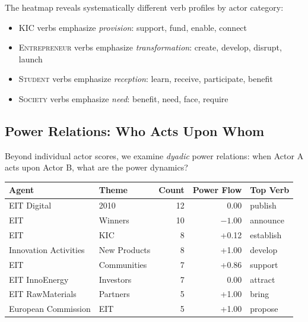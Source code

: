 \documentclass[../main.tex]{subfiles}
\begin{document}
The heatmap reveals systematically different verb profiles by actor category:

\begin{itemize}
    \item \textsc{KIC} verbs emphasize \textit{provision}: support, fund, enable, connect
    \item \textsc{Entrepreneur} verbs emphasize \textit{transformation}: create, develop, disrupt, launch
    \item \textsc{Student} verbs emphasize \textit{reception}: learn, receive, participate, benefit
    \item \textsc{Society} verbs emphasize \textit{need}: benefit, need, face, require
\end{itemize}

\subsection{Power Relations: Who Acts Upon Whom}

Beyond individual actor scores, we examine \textit{dyadic} power relations: when Actor A acts upon Actor B, what are the power dynamics?

\begin{center}
\small
\begin{tabular}{llrrl}
\toprule
\textbf{Agent} & \textbf{Theme} & \textbf{Count} & \textbf{Power Flow} & \textbf{Top Verb} \\
\midrule
EIT Digital & 2010 & 12 & 0.00 & publish \\
EIT & Winners & 10 & $-1.00$ & announce \\
EIT & KIC & 8 & +0.12 & establish \\
Innovation Activities & New Products & 8 & +1.00 & develop \\
EIT & Communities & 7 & +0.86 & support \\
EIT InnoEnergy & Investors & 7 & 0.00 & attract \\
EIT RawMaterials & Partners & 5 & +1.00 & bring \\
European Commission & EIT & 5 & +1.00 & propose \\
\bottomrule
\end{tabular}
\end{center}
\end{document}
